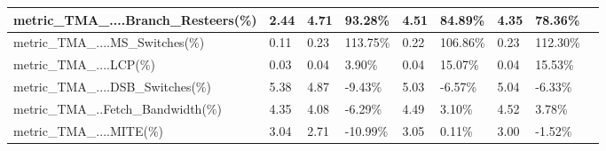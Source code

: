 \documentclass[12pt]{article}
\begin{document}
\begin{longtable}{|m{139.55pt}|m{40.35pt}|m{36.25pt}|m{36.25pt}|m{36.25pt}|m{42.10pt}|m{30.30pt}|m{44.65pt}|@{}m{0pt}@{}}
\raggedright\arraybackslash{}metric\_\allowbreak{}TMA\_\allowbreak{}....Branch\_\allowbreak{}Resteers(\%) & \centering\arraybackslash{}2.44 & \centering\arraybackslash{}4.71 & \cellcolor[HTML]{D9D9D9}\centering\arraybackslash{}93.28\% & \centering\arraybackslash{}4.51 & \cellcolor[HTML]{D9D9D9}\centering\arraybackslash{}84.89\% & \centering\arraybackslash{}4.35 & \cellcolor[HTML]{D9D9D9}\centering\arraybackslash{}78.36\% & \rule[-0.00pt]{0pt}{14.40pt} \\ \hline
\raggedright\arraybackslash{}metric\_\allowbreak{}TMA\_\allowbreak{}....MS\_\allowbreak{}Switches(\%) & \centering\arraybackslash{}0.11 & \centering\arraybackslash{}0.23 & \cellcolor[HTML]{D9D9D9}\centering\arraybackslash{}113.75\% & \centering\arraybackslash{}0.22 & \cellcolor[HTML]{D9D9D9}\centering\arraybackslash{}106.86\% & \centering\arraybackslash{}0.23 & \cellcolor[HTML]{D9D9D9}\centering\arraybackslash{}112.30\% & \rule[-0.00pt]{0pt}{14.40pt} \\ \hline
\raggedright\arraybackslash{}metric\_\allowbreak{}TMA\_\allowbreak{}....LCP(\%) & \centering\arraybackslash{}0.03 & \centering\arraybackslash{}0.04 & \cellcolor[HTML]{D9D9D9}\centering\arraybackslash{}3.90\% & \centering\arraybackslash{}0.04 & \cellcolor[HTML]{D9D9D9}\centering\arraybackslash{}15.07\% & \centering\arraybackslash{}0.04 & \cellcolor[HTML]{D9D9D9}\centering\arraybackslash{}15.53\% & \rule[-0.00pt]{0pt}{14.40pt} \\ \hline
\raggedright\arraybackslash{}metric\_\allowbreak{}TMA\_\allowbreak{}....DSB\_\allowbreak{}Switches(\%) & \centering\arraybackslash{}5.38 & \centering\arraybackslash{}4.87 & \cellcolor[HTML]{D9D9D9}\centering\arraybackslash{}-9.43\% & \centering\arraybackslash{}5.03 & \cellcolor[HTML]{D9D9D9}\centering\arraybackslash{}-6.57\% & \centering\arraybackslash{}5.04 & \cellcolor[HTML]{D9D9D9}\centering\arraybackslash{}-6.33\% & \rule[-0.00pt]{0pt}{14.40pt} \\ \hline
\raggedright\arraybackslash{}metric\_\allowbreak{}TMA\_\allowbreak{}..Fetch\_\allowbreak{}Bandwidth(\%) & \centering\arraybackslash{}4.35 & \centering\arraybackslash{}4.08 & \cellcolor[HTML]{D9D9D9}\centering\arraybackslash{}-6.29\% & \centering\arraybackslash{}4.49 & \cellcolor[HTML]{D9D9D9}\centering\arraybackslash{}3.10\% & \centering\arraybackslash{}4.52 & \cellcolor[HTML]{D9D9D9}\centering\arraybackslash{}3.78\% & \rule[-0.00pt]{0pt}{14.40pt} \\ \hline
\raggedright\arraybackslash{}metric\_\allowbreak{}TMA\_\allowbreak{}....MITE(\%) & \centering\arraybackslash{}3.04 & \centering\arraybackslash{}2.71 & \cellcolor[HTML]{D9D9D9}\centering\arraybackslash{}-10.99\% & \centering\arraybackslash{}3.05 & \cellcolor[HTML]{D9D9D9}\centering\arraybackslash{}0.11\% & \centering\arraybackslash{}3.00 & \cellcolor[HTML]{D9D9D9}\centering\arraybackslash{}-1.52\% & \rule[-0.00pt]{0pt}{14.40pt} \\ \hline

\end{longtable}
\end{document}
